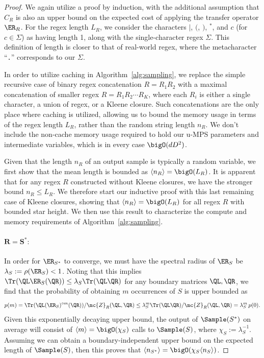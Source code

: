 \begin{proof}

We again utilize a proof by induction, with the additional assumption that $C_R$ is also an upper bound on the expected cost of applying the transfer operator $\ER_R$. For the regex length $L_R$, we consider the characters $|$, $($, $)$, $^*$, and $c$ (for $c \in \Sigma$) as having length 1, along with the single-character regex $\Sigma$. This definition of length is closer to that of real-world regex, where the metacharacter ``\texttt{.}'' corresponds to our $\Sigma$.

In order to utilize caching in Algorithm~\ref{alg:sampling}, 
we replace the simple recursive case of binary regex concatenation $R = R_1 R_2$ with a maximal concatenation of smaller regex $R = R_1 R_2 \cdots R_K$, where each $R_i$ is either a single character, a union of regex, or a Kleene closure. Such concatenations are the only place where caching is utilized, allowing us to bound the memory usage in terms of the regex length $L_R$, rather than the random string length $n_R$. We don't include the non-cache memory usage required to hold our u-MPS parameters and intermediate variables, which is in every case $\bigO(d D^2)$.

Given that the length $n_R$ of an output sample is typically a random variable, we first show that the mean length is bounded as $\langle n_R \rangle = \bigO(L_R)$. It is apparent that for any regex $R$ constructed without Kleene closures, we have the stronger bound $n_R \leq L_R$. We therefore start our inductive proof with this last remaining case of Kleene closures, showing that $\langle n_R \rangle = \bigO(L_R)$ for all regex $R$ with bounded star height. We then use this result to characterize the compute and memory requirements of Algorithm~\ref{alg:sampling}.

\paragraph{$\mathbf{R = S^*:}$} In order for $\ER_{S^*}$ to converge, we must have the spectral radius of $\ER_S$ be $\lambda_S := \rho(\ER_S) < 1$. Noting that this implies $\Tr(\QL \ER_S(\QR)) \leq \lambda_S \Tr(\QL \QR)$ for any boundary matrices $\QL, \QR$, we find that the probability of obtaining $m$ occurrences of $S$ is upper bounded as
%
\begin{equation*}
p(m) = \Tr(\QL (\ER_S)^{\circ m}(\QR)) / \mc{Z}_R(\QL, \QR) \leq \lambda_S^m \Tr(\QL \QR) / \mc{Z}_R(\QL, \QR) = \lambda_S^m\, p(0).
\end{equation*}
%
Given this exponentially decaying upper bound, the output of $\Sample(S^*)$ on average will consist of $\langle m \rangle = \bigO(\chi_S)$ calls to $\Sample(S)$, where $\chi_S := \lambda_S^{-1}$. Assuming we can obtain a boundary-independent upper bound on the expected length of $\Sample(S)$, then this proves that $\langle n_{S^*} \rangle = \bigO(\chi_S \langle n_S \rangle)$.


\end{proof}
